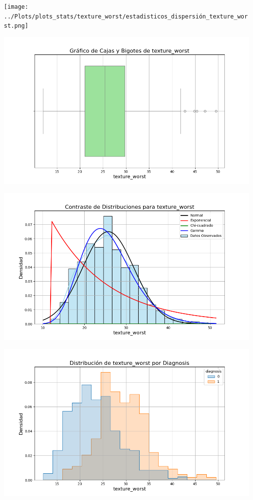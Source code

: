 \documentclass[a4paper, 12pt]{article}
\begin{document}
\texttt{[image: ../Plots/plots\_stats/texture\_worst/estadisticos\_dispersión\_texture\_worst.png]}



\includegraphics[width=\textwidth]{../Plots/plots_stats/texture_worst/boxplot_texture_worst.png}




\includegraphics[width=\textwidth]{../Plots/plots_stats/texture_worst/distribuciones_conocidas_texture_worst.png}

\includegraphics[width=\textwidth]{../Plots/plots_diagnosis/distribucion_texture_worst_por_diagnosis.png}
\end{document}
